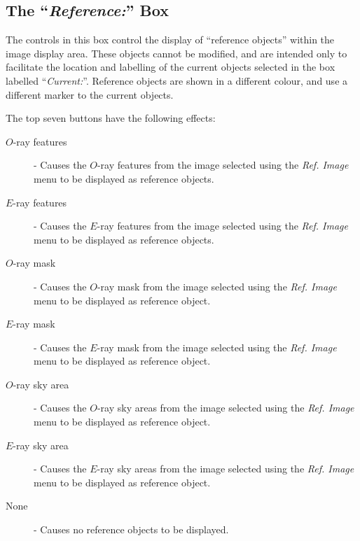 \documentclass[11pt]{article}
\newcommand{\htmlref}[2]{#1}
\newcommand{\xlabel}[1]{}
\newcommand{\mylabel}[1] {\xlabel{#1}\label{#1}}
\begin{document}
\subsection {\mylabel{POLKA_REFERENCE}The ``\emph{Reference:}'' Box}
The controls in this box control the display of ``reference objects''
within the \htmlref{image display area}{POLKA_IMAGE_DISPLAY}. These
objects cannot be modified, and are intended only to facilitate the location
and labelling of the current objects selected in the box labelled
``\htmlref{\emph{Current:}}{POLKA_CURRENT}''. Reference objects are
shown in a different colour, and use a different marker to the current
objects.

The top seven buttons have the following effects:

\begin{description}

\item [$O$-ray features] - Causes the $O$-ray features from the image
selected using the \htmlref{\emph{Ref. Image}}{POLKA_REF_IMAGE} menu to
be displayed as reference objects.

\item [$E$-ray features] - Causes the $E$-ray features from the image
selected using the \htmlref{\emph{Ref. Image}}{POLKA_REF_IMAGE} menu to
be displayed as reference objects.

\item [$O$-ray mask] - Causes the $O$-ray mask from the image
selected using the \htmlref{\emph{Ref. Image}}{POLKA_REF_IMAGE} menu to
be displayed as reference object.

\item [$E$-ray mask] - Causes the $E$-ray mask from the image
selected using the \htmlref{\emph{Ref. Image}}{POLKA_REF_IMAGE} menu to
be displayed as reference object.

\item [$O$-ray sky area] - Causes the $O$-ray sky areas from the image
selected using the \htmlref{\emph{Ref. Image}}{POLKA_REF_IMAGE} menu to
be displayed as reference object.

\item [$E$-ray sky area] - Causes the $E$-ray sky areas from the image
selected using the \htmlref{\emph{Ref. Image}}{POLKA_REF_IMAGE} menu to
be displayed as reference object.

\item [None] - Causes no reference objects to be displayed.

\end{description}
\end{document}
